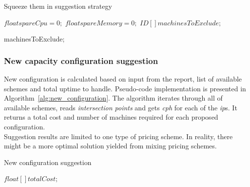 \documentclass[]{final_report}
\begin{document}
\begin{algorithm}[h]
\caption{Squeeze them in suggestion strategy}
\label{alg:squeeze-them-in}
 \algrenewcommand{}
 \algrenewcommand{}

  $float spareCpu = 0;$
  $float spareMemory = 0;$
  $ID[ ] machinesToExclude;$



\Return machinesToExclude;

\end{algorithm}

\subsubsection{New capacity configuration suggestion}

New configuration is calculated based on input from the report, list of available schemes and total uptime to handle. Pseudo-code implementation is presented in Algorithm~\ref{alg:new_configuration}. The algorithm iterates through all of available schemes, reads \textit{intersection points} and gets \textit{cph} for each of the \textit{ip}s. It returns a total cost and number of machines required for each proposed configuration. \\
Suggestion results are limited to one type of pricing scheme. In reality, there might be a more optimal solution yielded from mixing pricing schemes. 

\begin{algorithm}[h]
\caption{New configuration suggestion}
\label{alg:new_configuration}
 \algrenewcommand{}
 \algrenewcommand{}

  $float[ ] totalCost;$


\end{algorithm}
\end{document}

